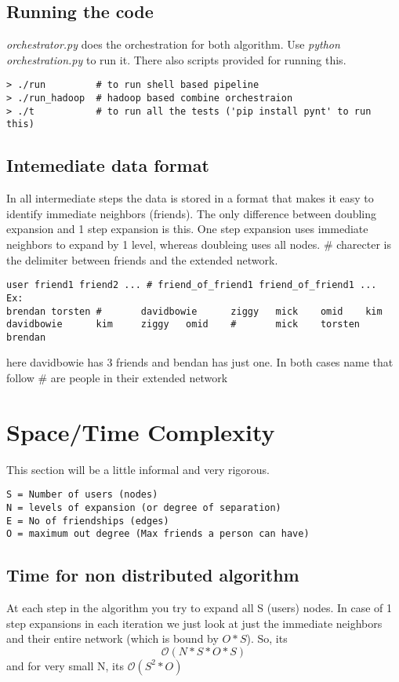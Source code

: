 \documentclass[a4paper]{article}
\begin{document}
\subsection{Running the code}
\emph{orchestrator.py} does the orchestration for both algorithm. Use \emph{\textit{python orchestration.py}} to run it. There also scripts provided for running this.
\begin{verbatim} 
> ./run         # to run shell based pipeline
> ./run_hadoop  # hadoop based combine orchestraion
> ./t           # to run all the tests ('pip install pynt' to run this)
\end{verbatim} 

\subsection{Intemediate data format}
In all intermediate steps the data is stored in a format that makes it easy to identify immediate neighbors (friends). The only difference between doubling expansion and 1 step expansion is this. One step expansion uses immediate neighbors to expand by 1 level, whereas doubleing uses all nodes. $\#$ charecter is the delimiter between friends and the extended network.
 
\begin{verbatim} 
user friend1 friend2 ... # friend_of_friend1 friend_of_friend1 ...
Ex:
brendan torsten #       davidbowie      ziggy   mick    omid    kim
davidbowie      kim     ziggy   omid    #       mick    torsten brendan

\end{verbatim} 
here davidbowie has 3 friends and bendan has just one. In both cases name that follow $\#$ are people in their extended network 

 
\section{Space/Time Complexity}
This section will be a little informal and very rigorous. 
\begin{verbatim} 
S = Number of users (nodes)
N = levels of expansion (or degree of separation)
E = No of friendships (edges)
O = maximum out degree (Max friends a person can have)
\end{verbatim} 
 
\subsection{Time for non distributed algorithm}
At each step in the algorithm you try to expand all S (users) nodes. In case of 1 step expansions in each iteration we just look at just the immediate neighbors and their entire network (which is bound by $O * S$). So, its \[\mathcal{O}(N * S * O * S)\] and for very small N, its $\mathcal{O}(S^2 * O)$
\end{document}

